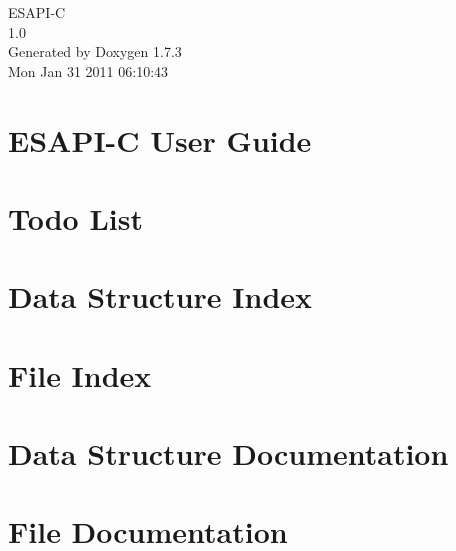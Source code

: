 \documentclass[a4paper]{book}
\begin{document}
\hypersetup{pageanchor=false}
\begin{titlepage}
\vspace*{7cm}
\begin{center}
{\Large ESAPI-\/C \\[1ex]\large 1.0 }\\
\vspace*{1cm}
{\large Generated by Doxygen 1.7.3}\\
\vspace*{0.5cm}
{\small Mon Jan 31 2011 06:10:43}\\
\end{center}
\end{titlepage}
\clearemptydoublepage
{}
\tableofcontents
\clearemptydoublepage
{}
\hypersetup{pageanchor=true}
\chapter{ESAPI-\/C User Guide}
\label{index}\hypertarget{index}{}
\chapter{Todo List}
\label{todo}
\hypertarget{todo}{}

\chapter{Data Structure Index}

\chapter{File Index}

\chapter{Data Structure Documentation}











\chapter{File Documentation}






























\printindex
\end{document}
